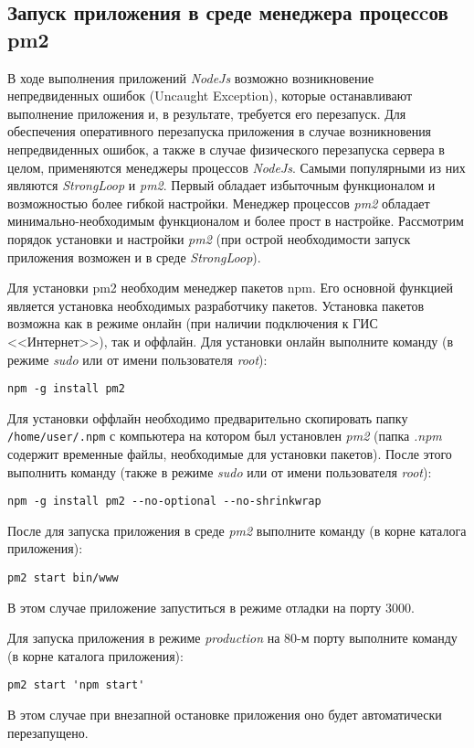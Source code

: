 \subsection{Запуск приложения в среде менеджера процесcов pm2}
	В ходе выполнения приложений \textit{NodeJs} возможно возникновение непредвиденных ошибок (Uncaught Exception), которые останавливают выполнение приложения и, в результате, требуется его перезапуск. Для обеспечения оперативного перезапуска приложения в случае возникновения непредвиденных ошибок, а также в случае физического перезапуска сервера в целом, применяются менеджеры процессов \textit{NodeJs}. Самыми популярными из них являются \textit{StrongLoop} и \textit{pm2}. Первый обладает избыточным функционалом и возможностью более гибкой настройки. Менеджер процессов \textit{pm2} обладает минимально-необходимым функционалом и более прост в настройке. Рассмотрим порядок установки и настройки \textit{pm2} (при острой необходимости запуск приложения возможен и в среде \textit{StrongLoop}).
	
	Для установки pm2 необходим менеджер пакетов npm. Его основной функцией является установка необходимых разработчику пакетов. Установка пакетов возможна как в режиме онлайн (при наличии подключения к ГИС <<Интернет>>), так и оффлайн. Для установки онлайн выполните команду (в режиме \textit{sudo} или от имени пользователя \textit{root}):
	
	\verb|npm -g install pm2|
	
	Для установки оффлайн необходимо предварительно скопировать папку \verb|/home/user/.npm| с компьютера на котором был установлен \textit{pm2} (папка \textit{.npm} содержит временные файлы, необходимые для установки пакетов). После этого выполнить команду (также в режиме \textit{sudo} или от имени пользователя \textit{root}):
	
	\verb|npm -g install pm2 --no-optional --no-shrinkwrap|
	
	После для запуска приложения в среде \textit{pm2} выполните команду (в корне каталога приложения):
	
	\verb|pm2 start bin/www|
	
	В этом случае приложение запуститься в режиме отладки на порту 3000.
	
	Для запуска приложения в режиме \textit{production} на 80-м порту выполните команду (в корне каталога приложения):
	
	\verb|pm2 start 'npm start'|
	
	В этом случае при внезапной остановке приложения оно будет автоматически перезапущено.
	
